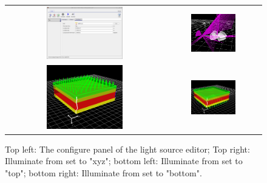 \begin{figure}[H]
\centering
\begin{tabular}{ c c }

\includegraphics[width=0.5\textwidth,height=0.4\textwidth]{./images/lights2.png}

&
\includegraphics[width=0.5\textwidth,height=0.4\textwidth]{./images/light_xyz.png}
\\

\includegraphics[width=0.5\textwidth,height=0.4\textwidth]{./images/light_top.png}

&
\includegraphics[width=0.5\textwidth,height=0.4\textwidth]{./images/light_btm.png}
\\
\end{tabular}
\caption{Top left: The configure panel of the light source editor; Top right: Illuminate from set to "xyz"; bottom left: Illuminate from set to "top"; bottom right: Illuminate from set to "bottom".}
\label{fig:lightcomesfrom}
\end{figure}





